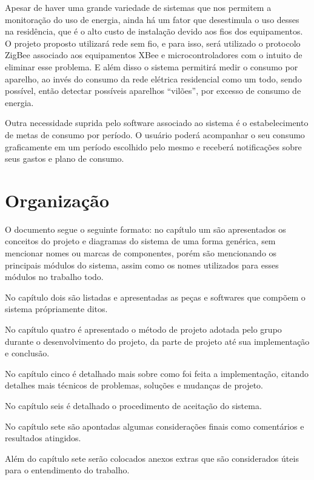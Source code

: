 Apesar de haver uma grande variedade de sistemas que nos permitem a monitoração do uso de energia, ainda há um fator que desestimula o uso desses na residência, que é o alto custo de instalação devido aos fios dos equipamentos. O projeto proposto utilizará rede sem fio, e para isso, será utilizado o protocolo ZigBee associado aos equipamentos XBee e microcontroladores com o intuito de eliminar esse problema. E além disso o sistema permitirá medir o consumo por aparelho, ao invés do consumo da rede elétrica residencial como um todo, sendo possível, então detectar possíveis aparelhos “vilões”, por excesso de consumo de energia.

Outra necessidade suprida pelo software associado ao sistema é o estabelecimento de metas de consumo por período. O usuário poderá acompanhar o seu consumo graficamente em um período escolhido pelo mesmo e receberá notificações sobre seus gastos e plano de consumo.

\section{Organização}
\label{Sec:organizacao}

O documento segue o seguinte formato: no capítulo um são apresentados os conceitos do projeto e diagramas do sistema de uma forma genérica, sem mencionar nomes ou marcas de componentes, porém são mencionando os principais módulos do sistema, assim como os nomes utilizados para esses módulos no trabalho todo.

No capítulo dois são listadas e apresentadas as peças e softwares que compõem o sistema própriamente ditos. 

No capítulo quatro é apresentado o método de projeto adotada pelo grupo durante o desenvolvimento do projeto, da parte de projeto até sua implementação e conclusão.

No capítulo cinco é detalhado mais sobre como foi feita a implementação, citando detalhes mais técnicos de problemas, soluções e mudanças de projeto.

No capítulo seis é detalhado o procedimento de aceitação do sistema.

No capítulo sete são apontadas algumas considerações finais como comentários e resultados atingidos.

Além do capítulo sete serão colocados anexos extras que são considerados úteis para o entendimento do trabalho.